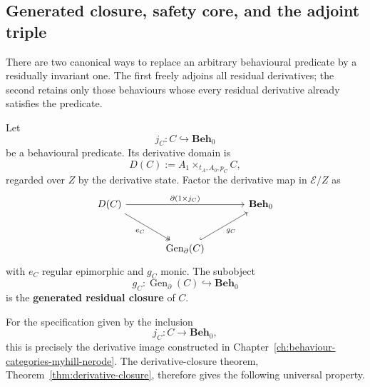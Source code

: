 \subsection{Generated closure, safety core, and the adjoint triple}
\label{subsec:generation-inclusion-safety}

There are two canonical ways to replace an arbitrary behavioural predicate by
a residually invariant one. The first freely adjoins all residual derivatives;
the second retains only those behaviours whose every residual derivative
already satisfies the predicate.

\begin{definition}
\label{def:generated-residual-closure}
    Let
    \[
        j_C:C\hookrightarrow\mathbf{Beh}_0
    \]
    be a behavioural predicate. Its derivative domain is
    \[
        D(C)
        :=
        A_1\times_{t_A,A_0,p_C}C,
    \]
    regarded over \(Z\) by the derivative state. Factor the derivative map in
    \(\mathcal E/Z\) as
    \[
    \begin{tikzcd}[column sep=large, row sep=large]
        D(C)
            \arrow[rr, "{\partial(1\times j_C)}"]
            \arrow[dr, two heads, "e_C"']
        &&
        \mathbf{Beh}_0
        \\
        &
        \operatorname{Gen}_\partial(C)
            \arrow[ur, hook, "g_C"']
        &
    \end{tikzcd}
    \]
    with \(e_C\) regular epimorphic and \(g_C\) monic. The subobject
    \[
        g_C:
        \operatorname{Gen}_\partial(C)
        \hookrightarrow
        \mathbf{Beh}_0
    \]
    is the \textbf{generated residual closure} of \(C\).
\end{definition}

For the specification given by the inclusion
\[
    j_C:C\to\mathbf{Beh}_0,
\]
this is precisely the derivative image constructed in
Chapter~\ref{ch:behaviour-categories-myhill-nerode}. The derivative-closure
theorem,
Theorem~\ref{thm:derivative-closure}, therefore gives the following universal
property.

